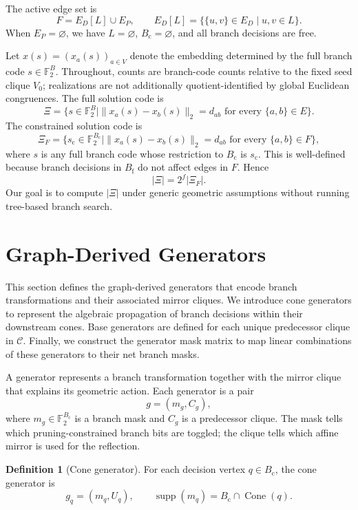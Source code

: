 \documentclass[11pt]{article}
\theoremstyle{plain}
\theoremstyle{definition}
\newtheorem{definition}{Definition}
\begin{document}
The active edge set is
\[
F = E_D[L] \cup E_P,
\qquad
E_D[L]=\{\{u,v\}\in E_D \mid u,v\in L\}.
\]
When $E_P=\varnothing$, we have $L=\varnothing$, $B_{\mathrm{c}}=\varnothing$, and all branch decisions are free.

Let $x(s)=(x_a(s))_{a\in V}$ denote the embedding determined by the full branch code $s\in\mathbb{F}_2^B$. Throughout, counts are branch-code counts relative to the fixed seed clique $V_0$; realizations are not additionally quotient-identified by global Euclidean congruences. The full solution code is
\[
\Xi
=
\{s \in \mathbb{F}_2^B \mid
\|x_a(s)-x_b(s)\|_2=d_{ab}
\text{ for every } \{a,b\}\in E\}.
\]
The constrained solution code is
\[
\Xi_F
=
\{s_{\mathrm{c}} \in \mathbb{F}_2^{B_{\mathrm{c}}} \mid
\|x_a(s)-x_b(s)\|_2=d_{ab}
\text{ for every } \{a,b\}\in F\},
\]
where $s$ is any full branch code whose restriction to $B_{\mathrm{c}}$ is $s_{\mathrm{c}}$. This is well-defined because branch decisions in $B_{\mathrm{f}}$ do not affect edges in $F$. Hence
\[
\lvert \Xi\rvert = 2^f \lvert \Xi_F\rvert.
\]
Our goal is to compute $\lvert \Xi\rvert$ under generic geometric assumptions without running tree-based branch search.

\section{Graph-Derived Generators}
\label{sec:generators}

This section defines the graph-derived generators that encode branch transformations and their associated mirror cliques. We introduce cone generators to represent the algebraic propagation of branch decisions within their downstream cones. Base generators are defined for each unique predecessor clique in $\mathcal{C}$. Finally, we construct the generator mask matrix to map linear combinations of these generators to their net branch masks.

A generator represents a branch transformation together with the mirror clique that explains its geometric action. Each generator is a pair
\[
g=(m_g, C_g),
\]
where $m_g \in \mathbb{F}_2^{B_{\mathrm{c}}}$ is a branch mask and $C_g$ is a predecessor clique. The mask tells which pruning-constrained branch bits are toggled; the clique tells which affine mirror is used for the reflection.

\begin{definition}[Cone generator]
\label{def:cone-generator}
For each decision vertex $q \in B_{\mathrm{c}}$, the cone generator is
\[
g_q = (m_q, U_q),
\qquad
\operatorname{supp}(m_q) = B_{\mathrm{c}} \cap \operatorname{Cone}(q).
\]
\end{definition}
\end{document}
